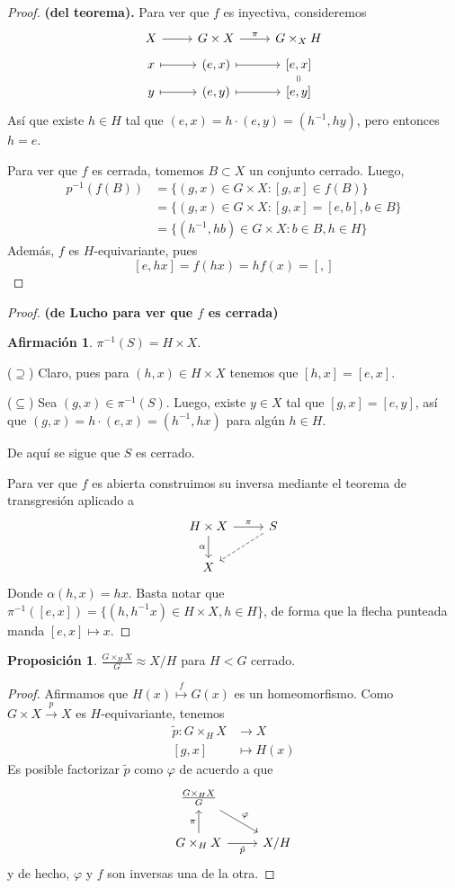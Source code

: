\documentclass[spanish]{article}
\theoremstyle{definition}
\newtheorem*{prop}{Proposición}
\newtheorem*{af}{Afirmación}
\begin{document}
\begin{proof}
	\textbf{(del teorema).}
	Para ver que $f$ es inyectiva, consideremos
	\[\begin{tikzcd}[row sep=tiny]
		X\arrow[r]&G\times X\arrow[r,"\pi"]&G\times_XH\\
		x\arrow[r,maps to]&(e,x)\arrow[r,maps to]& \left[e,x\right]\\
		y\arrow[r,maps to]&(e,y)\arrow[r,maps to]& \left[e,y\right]\arrow[u,equal]
	\end{tikzcd}\]
	Así que existe $h\in H$ tal que $(e,x)=h\cdot(e,y)=(h^{-1},hy)$, pero entonces $h=e$.
	
	Para ver que $f$ es cerrada, tomemos $B\subset X$ un conjunto cerrado. Luego, 
	\begin{align*}
		p^{-1}\left(f(B)\right)&=\{(g,x)\in G\times X:[g,x]\in f(B)\}\\
		&=\{(g,x)\in G\times X:[g,x]=[e,b], b\in B\}\\
		&=\{(h^{-1},hb)\in G\times X:b\in B,h\in H\}
	\end{align*}
	Además, $f$ es $H$-equivariante, pues
	\[[e,hx]=f(hx)=hf(x)=[,]\]
\end{proof}
\begin{proof}
	\textbf{(de Lucho para ver que $f$ es cerrada)}
	\begin{af}
		$\pi^{-1}(S)=H\times X$.
	\end{af}
	($\supseteq$) Claro, pues para $(h,x)\in H\times X$ tenemos que $[h,x]=[e,x]$.
	
	($\subseteq$) Sea $(g,x)\in\pi^{-1}(S)$. Luego, existe $y\in X$ tal que $[g,x]=[e,y]$, así que $(g,x)=h\cdot (e,x)=(h^{-1},hx)$ para algún $h\in H$.
	
	De aquí se sigue que $S$ es cerrado.
	
	Para ver que $f$ es abierta  construimos su inversa mediante el teorema de transgresión aplicado a 
	\[\begin{tikzcd}
		H\times X\arrow[r,"\pi"]\arrow[d,swap,"\alpha"]&S\arrow[dl,dashed]\\
		X
	\end{tikzcd}\]
	Donde $\alpha(h,x)=hx$. Basta notar que $\pi^{-1}([e,x])=\{(h,h^{-1}x)\in H\times X,h\in H\}$, de forma que la flecha punteada manda $[e,x]\mapsto x$.
\end{proof}
\begin{prop}
	$\frac{G\times_HX}{G}\approx X/H$ para $H<G$ cerrado. 
\end{prop}
\begin{proof}
	Afirmamos que $H(x)\overset{f}{\mapsto}G(x)$ es un homeomorfismo. Como ${G\times X\overset{p}{\to}X}$ es $H$-equivariante, tenemos
	\begin{align*}
		\tilde{p}:G\times_HX&\to X\\
		[g,x]&\mapsto H(x)
	\end{align*}
	Es posible factorizar $\tilde{p}$ como $\varphi$ de acuerdo a que
	\[\begin{tikzcd}
		\frac{G\times_HX}{G}\arrow[rd,"\varphi"]\\
		G\times_HX\arrow[u,"\pi"]\arrow[r,swap,"\tilde{p}"]&X/H
	\end{tikzcd}\]
	y de hecho, $\varphi$ y $f$ son inversas una de la otra.
\end{proof}
\end{document}
